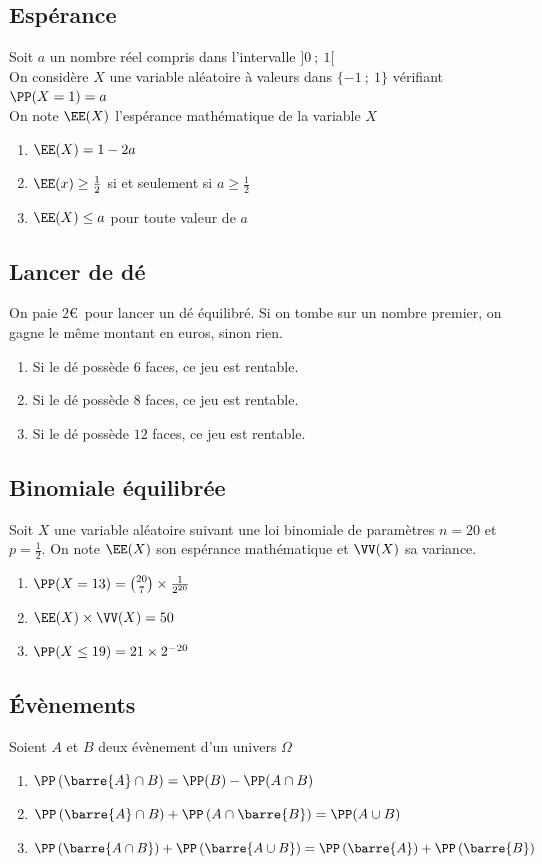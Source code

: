 \documentclass[oneside,12pt]{article}
\begin{document}
\subsection{Espérance}
Soit $a$ un nombre réel compris dans l'intervalle $]0~;~1[$ \\
On considère $X$ une variable aléatoire à valeurs dans $\{-1~;~1\}$ vérifiant $\PP(X=1)=a$ \\
On note $\EE(X)$ l'espérance mathématique de la variable $X$
\begin{enumerate}
	\item $\EE(X)=1-2a$
	\item $\EE(x) \geq \frac{1}{2}$ si et seulement si $a\geq\frac{1}{2}$
	\item $\EE(X) \leq a$ pour toute valeur de $a$
\end{enumerate}



\subsection{Lancer de dé}
On paie $2$\euro\, pour lancer un dé équilibré. Si on tombe sur un nombre premier, on gagne le même montant en euros, sinon rien.
\begin{enumerate}
	\item Si le dé possède $6$ faces, ce jeu est rentable.
	\item Si le dé possède $8$ faces, ce jeu est rentable.
	\item Si le dé possède $12$ faces, ce jeu est rentable.
\end{enumerate}



\subsection{Binomiale équilibrée}
Soit $X$ une variable aléatoire suivant une loi binomiale de paramètres $n=20$ et $p=\frac{1}{2}$. On note $\EE(X)$ son espérance mathématique et $\VV(X)$ sa variance.
\begin{enumerate}
	\item $\PP(X=13)=\binom{20}{7}\times\frac{1}{2^{20}}$
	\item $\EE(X)\times\VV(X)=50$
	\item $\PP(X\leq19)=21\times2^{-20}$
\end{enumerate}



\subsection{Évènements}
Soient $A$ et $B$ deux évènement d'un univers $\Omega$
\begin{enumerate}
	\item $\PP\left(\barre{A}\cap B\right)=\PP(B)-\PP(A\cap B)$
	\item $\PP\left(\barre{A}\cap B\right) + \PP\left(A \cap \barre{B}\right) = \PP(A\cup B)$
	\item $\PP\left(\barre{A \cap B}\right) + \PP\left(\barre{A \cup B}\right) = \PP\left(\barre{A}\right)+\PP\left(\barre{B}\right)$
\end{enumerate}
\end{document}
